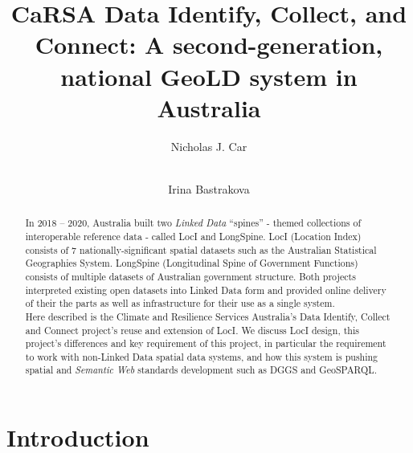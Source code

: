 \documentclass[runningheads]{llncs}
\begin{document}
\title{CaRSA Data Identify, Collect, and Connect: A second-generation, national GeoLD system in Australia}

\author{
    Nicholas J. Car \and \\
    Irina Bastrakova
}



\maketitle

\begin{abstract}
In 2018 – 2020, Australia built two \textit{Linked Data} ``spines'' - themed collections of interoperable reference data - called LocI and LongSpine. 
LocI (Location Index) consists of 7 nationally-significant spatial datasets such as the Australian Statistical Geographies System. 
LongSpine (Longitudinal Spine of Government Functions) consists of multiple datasets of Australian government structure. Both projects interpreted existing open 
datasets into Linked Data form and provided online delivery of their the parts as well as infrastructure for their use as a single system.\\

Here described is the Climate and Resilience Services Australia’s Data Identify, Collect and Connect project's reuse and extension of LocI. 
We discuss LocI design, this project's differences and key requirement of this project, in particular the requirement to work with non-Linked Data 
spatial data systems, and how this system is pushing spatial and \textit{Semantic Web} standards development such as DGGS and GeoSPARQL.

\end{abstract}


\section{Introduction}\label{sec:introduction}
\end{document}
